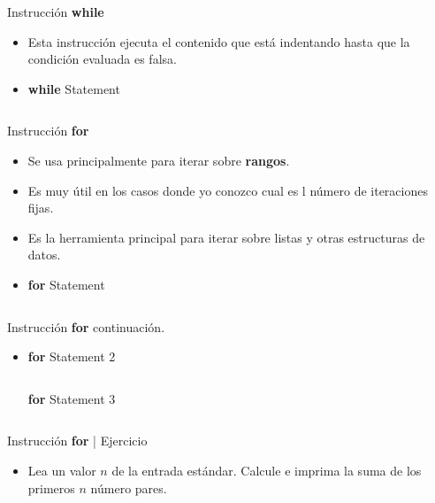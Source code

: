 \documentclass[usenames, dvipsnames, compress]{beamer}
\begin{document}
	\begin{frame}{Instrucción \textbf{while}}
	\begin{itemize}
		\item Esta instrucción ejecuta el contenido que está indentando hasta que la condición evaluada es falsa.
		\pause
		\item [] \begin{block}{\textbf{while} Statement}
			\inputminted[xleftmargin=\parindent,linenos]{python}{codes/while_statement.m}
		\end{block}
	\end{itemize}
	\end{frame}
	\begin{frame}{Instrucción \textbf{for}}
	\begin{itemize}
		\item Se usa principalmente para iterar sobre \textbf{rangos}.
		\pause
		\item Es muy útil en los casos donde yo conozco cual es l número de iteraciones fijas.
		\pause
		\item Es la herramienta principal para iterar sobre listas y otras estructuras de datos.
		\pause
		\item [] \begin{block}{\textbf{for} Statement}
			\inputminted[xleftmargin=\parindent,linenos]{python}{codes/for_statement.m}
		\end{block}
	\end{itemize}
	\end{frame}
	\begin{frame}[allowframebreaks]{Instrucción \textbf{for} continuación.}
	\begin{itemize}
	\item [] \begin{block}{\textbf{for} Statement 2}
		\inputminted[xleftmargin=\parindent,linenos]{python}{codes/for_statement2.m}
	\end{block}
		\begin{block}{\textbf{for} Statement 3}
		\inputminted[xleftmargin=\parindent,linenos]{python}{codes/for_statement3.m}
	\end{block}
	\end{itemize}
	\end{frame}
	\begin{frame}{Instrucción \textbf{for} | Ejercicio}
		\begin{itemize}
			\item Lea un valor $n$ de la entrada estándar. Calcule e imprima la suma de los primeros $n$ número pares.
		\end{itemize}
	\end{frame}
\end{document}
